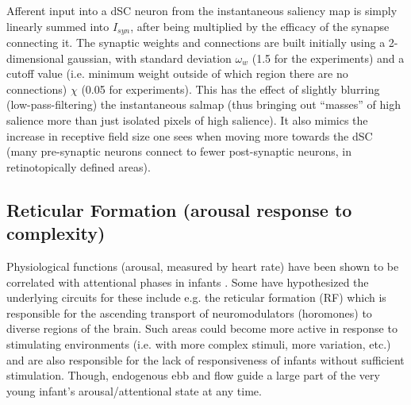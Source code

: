 \documentclass[12pt]{article}
\begin{document}
Afferent input into a dSC neuron from the instantaneous saliency map
is simply linearly summed into $I_{syn}$, after being multiplied by
the efficacy of the synapse connecting it. The synaptic weights and
connections are built initially using a 2-dimensional gaussian, with
standard deviation $\omega_w$ (1.5 for the experiments) and a cutoff
value (i.e. minimum weight outside of which region there are no
connections) $\chi$ (0.05 for experiments). This has the effect of
slightly blurring (low-pass-filtering) the instantaneous salmap (thus
bringing out ``masses'' of high salience more than just isolated
pixels of high salience). It also mimics the increase in receptive
field size one sees when moving more towards the dSC (many
pre-synaptic neurons connect to fewer post-synaptic neurons, in
retinotopically defined areas).

\subsection{Reticular Formation (arousal response to complexity)}

Physiological functions (arousal, measured by heart rate) have been
shown to be correlated with attentional phases in infants
\cite{richards_casey_1990}. Some have hypothesized the underlying
circuits for these include e.g. the reticular formation (RF) which is
responsible for the ascending transport of neuromodulators (horomones)
to diverse regions of the brain. Such areas could become more active
in response to stimulating environments (i.e. with more complex
stimuli, more variation, etc.) and are also responsible for the lack
of responsiveness of infants without sufficient stimulation. Though,
endogenous ebb and flow guide a large part of the very young infant's
arousal/attentional state at any time.
\end{document}
